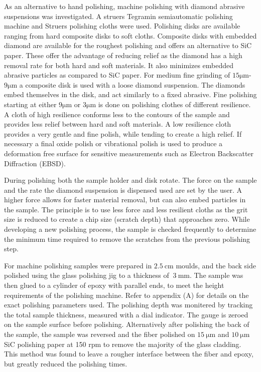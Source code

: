 As an alternative to hand polishing, machine polishing with diamond abrasive suspensions was investigated. A struers Tegramin semiautomatic polishing machine and Struers polishing cloths were used. Polishing disks are available ranging from hard composite disks to soft cloths. Composite disks with embedded diamond are available for the roughest polishing and offers an alternative to SiC paper. These offer the advantage of reducing relief as the diamond has a high removal rate for both hard and soft materials. It also minimizes embedded abrasive particles as compared to SiC paper. For medium fine grinding of $15\si{\micro\meter}$-$9\si{\micro\meter}$ a composite disk is used with a loose diamond suspension. The diamonds embed themselves in the disk, and act similarly to a fixed abrasive. Fine polishing starting at either $9 \si{\micro\meter}$ or $3\si{\micro\meter}$ is done on polishing clothes of different resilience. A cloth of high resilience conforms less to the contours of the sample and provides less relief between hard and soft materials. A low resilience cloth provides a very gentle and fine polish, while tending to create a high relief. If necessary a final oxide polish or vibrational polish is used to produce a deformation free surface for sensitive measurements such as Electron Backscatter Diffraction (EBSD). 

During polishing both the sample holder and disk rotate. The force on the sample and the rate the diamond suspension is dispensed used are set by the user. A higher force allows for faster material removal, but can also embed particles in the sample. The principle is to use less force and less resilient cloths as the grit size is reduced to create a chip size (scratch depth) that approaches zero. While developing a new polishing process, the sample is checked frequently to determine the minimum time required to remove the scratches from the previous polishing step. 

For machine polishing samples were prepared in $\SI{2.5}{\cm}$ moulds, and the back side polished using the glass polishing jig to a thickness of $~\SI{3}{\mm}$. The sample was then glued to a cylinder of epoxy with parallel ends, to meet the height requirements of the polishing machine. Refer to appendix (A) for details on the exact polishing parameters used. The polishing depth was monitered by tracking the total sample thickness, measured with a dial indicator. The gauge is zeroed on the sample surface before polishing. Alternatively after polishing the back of the sample, the sample was reversed and the fiber polished on $\SI{15}{\micro\meter}$ and $\SI{10}{\micro\meter}$ SiC polishing paper at 150 rpm to remove the majority of the glass cladding. This method was found to leave a rougher interface between the fiber and epoxy, but greatly reduced the polishing times. 





